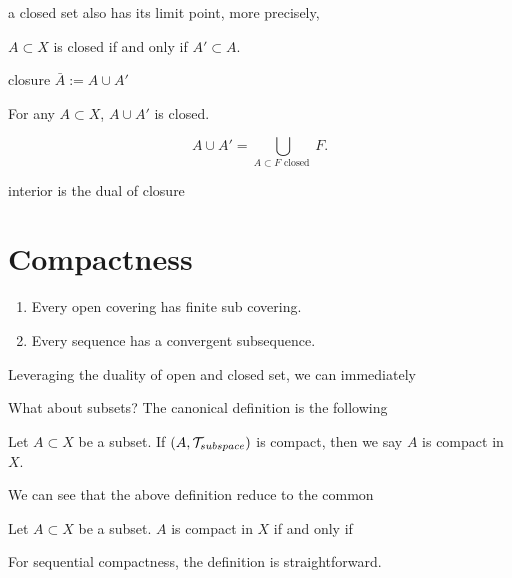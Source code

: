 a closed set also has its limit point, more precisely,
\begin{theorem}
    $A\subset X$ is closed if and only if $A'\subset A$.
\end{theorem}

closure $\bar{A}:=A\cup A'$
\begin{theorem}
    For any $A\subset X$, $A\cup A'$ is closed.
\end{theorem}
\begin{corollary}
    \begin{equation*}
        A\cup A'=\bigcup_{A\subset F \text{ closed }}F.
    \end{equation*}
\end{corollary}

interior is the dual of closure 

\begin{definition}
    
\end{definition}

\begin{definition}
    
\end{definition}


\section{Compactness}



\begin{definition}
    \begin{enumerate}[label=(\roman*)]
        \item Every open covering has finite sub covering.
        \item Every sequence has a convergent subsequence.
    \end{enumerate}
    
\end{definition}
Leveraging the duality of open and closed set, we can immediately


What about subsets? The canonical definition is the following
\begin{remark}
    Let $A\subset X$ be a subset. If $(A,\mathcal{T}_{subspace})$ is compact, then we say $A$ is compact in $X$.
\end{remark}
We can see that the above definition reduce to the common 
\begin{proposition}
    Let $A\subset X$ be a subset. $A$ is compact in $X$ if and only if 
\end{proposition}
For sequential compactness, the definition is straightforward.


